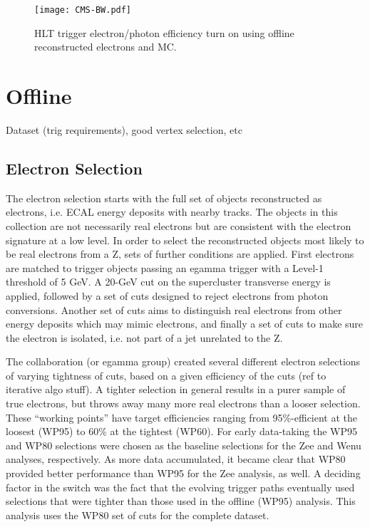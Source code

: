  \begin{figure}[htb]
  \begin{center}
    \texttt{[image: CMS-BW.pdf]}
  \end{center}
  \caption[HLT trigger electron/photon efficiency turn on using offline reconstructed electrons and MC]{HLT trigger electron/photon efficiency turn on using offline reconstructed electrons and MC.}
  \label{fig:HLTriggerObjectEfficiencies}
 \end{figure}



\clearpage
\section{Offline}
Dataset (trig requirements), good vertex selection, etc
\subsection{Electron Selection}
The electron selection starts with the full set of objects reconstructed as electrons, 
i.e. ECAL energy deposits with nearby tracks.  
The objects in this collection are not necessarily real electrons 
but are consistent with the electron signature at a low level.  
In order to select the reconstructed objects most likely to be real electrons from a Z, 
sets of further conditions are applied.  
First electrons are matched to trigger objects passing an egamma trigger with a Level-1 threshold of 5 GeV.  
A 20-GeV cut on the supercluster transverse energy is applied,
followed by a set of cuts designed to reject electrons from photon conversions.  
Another set of cuts aims to distinguish real electrons from other energy deposits which may mimic electrons, 
and finally a set of cuts to make sure the electron is isolated, i.e. not part of a jet unrelated to the Z.  

The collaboration (or egamma group) created several different electron selections of varying tightness of cuts,
based on a given efficiency of the cuts (ref to iterative algo stuff).  
A tighter selection in general results in a purer sample of true electrons, but throws away many more
real electrons than a looser selection.  
These ``working points'' have target efficiencies ranging from 95\%-efficient at the loosest (WP95) to 60\% at the tightest (WP60).  
For early data-taking the WP95 and WP80 selections were chosen as the baseline selections for the Zee and Wenu analyses, respectively.
As more data accumulated, it became clear that WP80 provided better performance than WP95 for the Zee analysis, as well.  
A deciding factor in the switch was the fact that the evolving trigger paths eventually used selections that were
tighter than those used in the offline (WP95) analysis.  
This analysis uses the WP80 set of cuts for the complete dataset.  

